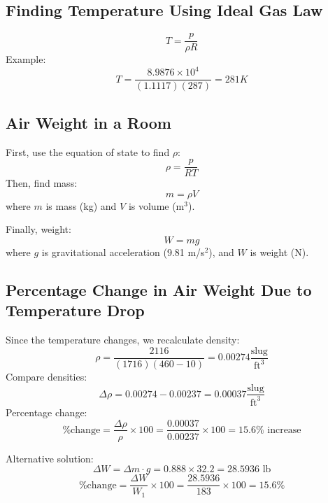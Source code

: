 \documentclass{article}
\begin{document}
\subsection{Finding Temperature Using Ideal Gas Law}
\begin{equation}
    T = \frac{p}{\rho R}
\end{equation}
Example:
\begin{equation}
    T = \frac{8.9876 \times 10^4}{(1.1117)(287)} = 281K
\end{equation}

\subsection{Air Weight in a Room}
First, use the equation of state to find $\rho$:
\begin{equation}
    \rho = \frac{p}{RT}
\end{equation}
Then, find mass:
\begin{equation}
    m = \rho V
\end{equation}
where $m$ is mass (kg) and $V$ is volume (m$^3$).

Finally, weight:
\begin{equation}
    W = mg
\end{equation}
where $g$ is gravitational acceleration (9.81 m/s$^2$), and $W$ is weight (N).

\subsection{Percentage Change in Air Weight Due to Temperature Drop}
Since the temperature changes, we recalculate density:
\begin{equation}
    \rho = \frac{2116}{(1716)(460 -10)} = 0.00274 \frac{\text{slug}}{\text{ft}^3}
\end{equation}
Compare densities:
\begin{equation}
    \Delta \rho = 0.00274 - 0.00237 = 0.00037 \frac{\text{slug}}{\text{ft}^3}
\end{equation}
Percentage change:
\begin{equation}
    \% \text{change} = \frac{\Delta \rho}{\rho} \times 100 = \frac{0.00037}{0.00237} \times 100 = 15.6\%\text{ increase}
\end{equation}

Alternative solution:
\begin{equation}
    \Delta W = \Delta m \cdot g = 0.888 \times 32.2 = 28.5936 \text{ lb}
\end{equation}
\begin{equation}
    \% \text{change} = \frac{\Delta W}{W_1} \times 100 = \frac{28.5936}{183} \times 100 = 15.6\%
\end{equation}
\end{document}
